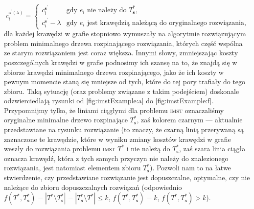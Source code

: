 \begin{equation}
c^{\textbf{s}^{\prime} \left( \lambda \right)}_{i} = \left\{\begin{matrix}
c^{\textbf{s}^{\prime}}_{i} & \text{gdy $e_{i}$ nie należy do $T^{\ast}_{\textbf{s}}$,}\\ 
c^{\textbf{s}^{\prime}}_{i} - \lambda &  \text{gdy $e_{i}$ jest krawędzią należącą do oryginalnego rozwiązania,}
\end{matrix}\right.
\end{equation}
dla każdej krawędzi w grafie stopniowo wymuszały na algorytmie rozwiązującym problem minimalnego drzewa rozpinającego rozwiązania, których część wspólna ze starym rozwiązaniem jest coraz większa. Innymi słowy, zmniejszając koszty poszczególnych krawędzi w grafie podnosimy ich szansę na to, że znajdą się w zbiorze krawędzi minimalnego drzewa rozpinającego, jako że ich koszty w pewnym momencie staną się mniejsze od tych, które do tej pory trafiały do tego zbioru. Taką sytuację (oraz problemy związane z takim podejściem) doskonale odzwierciedlają rysunki od \ref{fig:imstExample:a} do \ref{fig:imstExample:f}. Przypomnijmy tylko, że liniami ciągłymi dla problemu \textsc{imst} oznaczaliśmy oryginalne minimalne drzewo rozpinające $T^{\ast}_{\textbf{s}}$, zaś kolorem czarnym --- aktualnie przedstawiane na rysunku rozwiązanie (to znaczy, że czarną linią przerywaną są zaznaczone te krawędzie, które w wyniku zmiany kosztów krawędzi w grafie weszły do rozwiązania problemu \textsc{imst} $T^{\ast}$ i nie należą do $T^{\ast}_{\textbf{s}}$, zaś szara linia ciągła oznacza krawędź, która z tych samych przyczyn nie należy do znalezionego rozwiązania, jest natomiast elementem zbioru $T^{\ast}_{\textbf{s}}$). Pozwoli nam to na łatwe stwierdzenie, czy przedstawiane rozwiązanie jest dopuszczalne, optymalne, czy nie należące do zbioru dopuszczalnych rozwiązań (odpowiednio $f \left( T^{\ast}, T^{\ast}_{\textbf{s}} \right) = \left| T^{\ast} \setminus T^{\ast}_{\textbf{s}} \right| = \left| T^{\ast}_{\textbf{s}} \setminus T^{\ast} \right| \leqslant k$, $f \left( T^{\ast}, T^{\ast}_{\textbf{s}} \right) = k$, $f \left( T^{\ast}, T^{\ast}_{\textbf{s}} \right) > k$).

